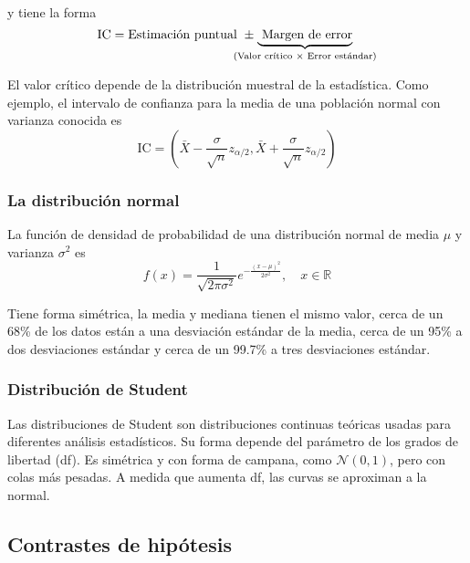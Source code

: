 \noindent y tiene la forma 
\begin{equation*}
\text{IC} = \text{Estimación puntual } \pm \hspace{-0.65cm}\underbrace{\text{ Margen de error}}_{\text{(Valor crítico } \times \text{ Error estándar)}}
\end{equation*}

El valor crítico depende de la distribución muestral de la estadística. Como ejemplo, el intervalo de confianza para la media de una población normal con varianza conocida es
\begin{equation}
\text{IC} = \left(\bar{X} - \frac{\sigma}{\sqrt{n}} z_{\alpha/2}, \bar{X} + \frac{\sigma}{\sqrt{n}} z_{\alpha/2}\right)
\end{equation}

\subsubsection{La distribución normal}

La función de densidad de probabilidad de una distribución normal de media $\mu$ y varianza $\sigma^2$ es
\begin{equation}
f(x) = \frac{1}{\sqrt{2\pi\sigma^2}} e^{-\frac{(x - \mu)^2}{2\sigma^2}}, \quad x \in \mathbb{R}
\end{equation}

Tiene forma simétrica, la media y mediana tienen el mismo valor, cerca de un 68\% de los datos están a una desviación estándar de la media, cerca de un 95\% a dos desviaciones estándar y cerca de un 99.7\% a tres desviaciones estándar. \\

\subsubsection{Distribución de Student}

Las distribuciones de Student son distribuciones continuas teóricas usadas para diferentes análisis estadísticos. Su forma depende del parámetro de los grados de libertad (df). Es simétrica y con forma de campana, como $\mathcal{N}(0, 1)$, pero con colas más pesadas. A medida que aumenta df, las curvas se aproximan a la normal. \\

\subsection{Contrastes de hipótesis}

